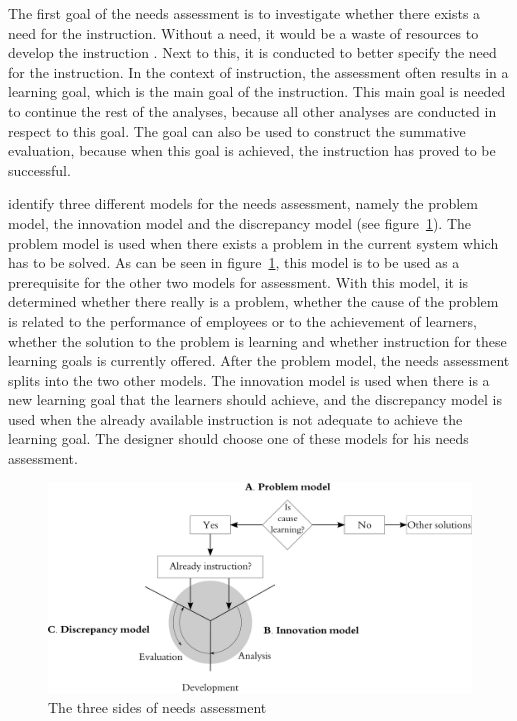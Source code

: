 \documentclass[11pt,twoside]{report} %
\begin{document}
The first goal of the needs assessment is to investigate whether there exists a need for the instruction.  Without a need, it would be a waste of resources to develop the instruction \cite{smithragan}. Next to this, it is conducted to better specify the need for the instruction. In the context of instruction, the assessment often results in a learning goal, which is the main goal of the instruction. This main goal is needed to continue the rest of the analyses, because all other analyses are conducted in respect to this goal. The goal can also be used to construct the summative evaluation, because when this goal is achieved, the instruction has proved to be successful.

 identify three different models for the needs assessment, namely the problem model, the innovation model and the discrepancy model (see figure~\ref{fig:needsassessment}). The problem model is used when there exists a problem in the current system which has to be solved. As can be seen in figure~\ref{fig:needsassessment}, this model is to be used as a prerequisite for the other two models for assessment. With this model, it is determined whether there really is a problem, whether the cause of the problem is related to the performance of employees or to the achievement of learners, whether the solution to the problem is learning and whether instruction for these learning goals is currently offered. After the problem model, the needs assessment splits into the two other models. The innovation model is used when there is a new learning goal that the learners should achieve, and the discrepancy model is used when the already available instruction is not adequate to achieve the learning goal. The designer should choose one of these models for his needs assessment.

\begin{figure}[h]
\centering
\includegraphics[width=\textwidth]{needsassessment}
\caption{The three sides of needs assessment \protect\cite{smithragan}\label{fig:needsassessment}}
\end{figure}
\end{document}
